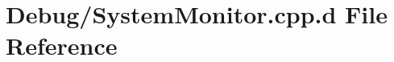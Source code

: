 \hypertarget{_debug_2_system_monitor_8cpp_8d}{\section{\-Debug/\-System\-Monitor.cpp.\-d \-File \-Reference}
\label{_debug_2_system_monitor_8cpp_8d}
}

